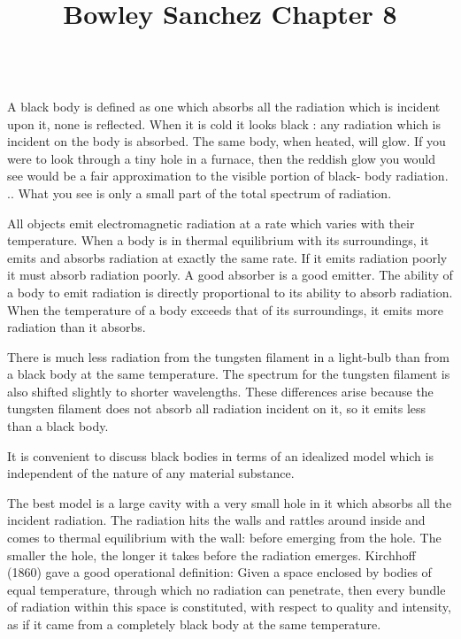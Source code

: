 \documentclass{../template/texnote}
\title{Bowley Sanchez Chapter 8}
\begin{document}
    \maketitle {}

\\
A black body is defined as one which absorbs all the radiation which is
incident upon it, none is reflected. When it is cold it looks black : any radiation
which is incident on the body is absorbed. The same body, when heated, will
glow. If you were to look through a tiny hole in a furnace, then the reddish glow
you would see would be a fair approximation to the visible portion of black-
body radiation.
..
What you see is only a small part of the total
spectrum of radiation.


All objects emit electromagnetic radiation at a rate which varies with their
temperature.
When a body is in thermal equilibrium with its surroundings, it emits and
absorbs radiation at exactly the same rate. If it emits radiation poorly it must
absorb radiation poorly. A good absorber is a good emitter. The ability of a
body to emit radiation is directly proportional to its ability to absorb radiation.
When the temperature of a body exceeds that of its surroundings, it emits more
radiation than it absorbs.

There is much less radiation from the tungsten filament in a light-bulb than
from a black body at the same temperature.
The spectrum for the tungsten
filament is also shifted slightly to shorter wavelengths.
These differences arise
because the tungsten filament does not absorb all radiation incident on it, so it
emits less than a black body.


It is convenient to
discuss black bodies in terms of an idealized model which is independent of the
nature of any material substance.


The best model is a large cavity with a very
small hole in it which absorbs all the incident radiation. The radiation hits the
walls and rattles around inside and comes to thermal equilibrium with the wall:
before emerging from the hole. The smaller the hole, the longer it takes before the radiation emerges.
Kirchhoff (1860) gave a good operational definition: Given
a space enclosed by bodies of equal temperature, through which no radiation can
penetrate, then every bundle of radiation within this space is constituted, with
respect to quality and intensity, as if it came from a completely black body at
the same temperature.
\end{document}

